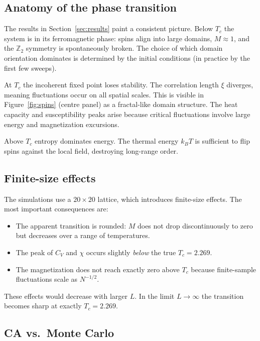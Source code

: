 \documentclass[11pt,a4paper]{article}
\begin{document}
\subsection{Anatomy of the phase transition}

The results in Section~\ref{sec:results} paint a consistent picture. Below
$T_c$ the system is in its ferromagnetic phase: spins align into large
domains, $M \approx 1$, and the $\mathbb{Z}_2$ symmetry is spontaneously
broken. The choice of which domain orientation dominates is determined by
the initial conditions (in practice by the first few sweeps).

At $T_c$ the incoherent fixed point loses stability. The correlation length
$\xi$ diverges, meaning fluctuations occur on all spatial scales. This is
visible in Figure~\ref{fig:spins} (centre panel) as a fractal-like domain
structure. The heat capacity and susceptibility peaks arise because critical
fluctuations involve large energy and magnetization excursions.

Above $T_c$ entropy dominates energy. The thermal energy $k_B T$ is
sufficient to flip spins against the local field, destroying long-range order.

\subsection{Finite-size effects}

The simulations use a $20\times 20$ lattice, which introduces finite-size
effects. The most important consequences are:

\begin{itemize}[leftmargin=1.5em]
  \item The apparent transition is rounded: $M$ does not drop discontinuously
    to zero but decreases over a range of temperatures.
  \item The peak of $C_V$ and $\chi$ occurs slightly \emph{below} the
    true $T_c = 2.269$.
  \item The magnetization does not reach exactly zero above $T_c$ because
    finite-sample fluctuations scale as $N^{-1/2}$.
\end{itemize}

These effects would decrease with larger $L$. In the limit $L \to \infty$
the transition becomes sharp at exactly $T_c = 2.269$.

\subsection{CA vs.\ Monte Carlo}
\end{document}
